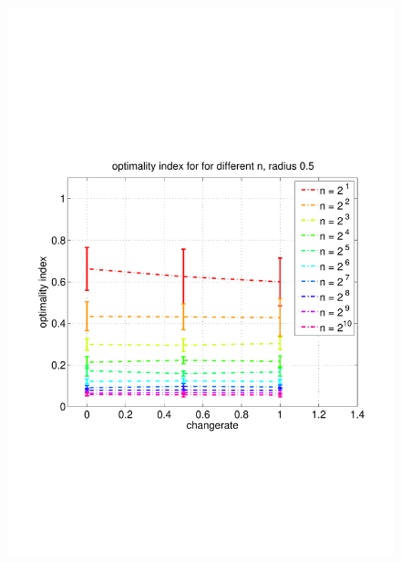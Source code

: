 \documentclass[11pt]{article}
\begin{document}
\begin{figure}
	\includegraphics[width=\linewidth]{../../code/data/2014_12_12_00_55_41/figure_11}
\end{figure}
\end{document}
